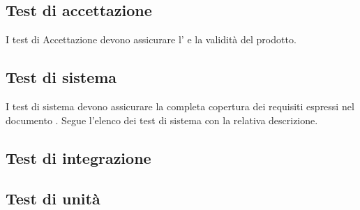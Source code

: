 \subsection{Test di accettazione}
I test di Accettazione devono assicurare l' e la validità del prodotto.


\newpage


\newpage
\subsection{Test di sistema}
I test di sistema devono assicurare la completa copertura dei requisiti espressi nel documento \AdR{}.
Segue l'elenco dei test di sistema con la relativa descrizione.


\newpage

\newpage

\subsection{Test di integrazione}


\newpage

\newpage

\subsection{Test di unità}


\newpage

\newpage